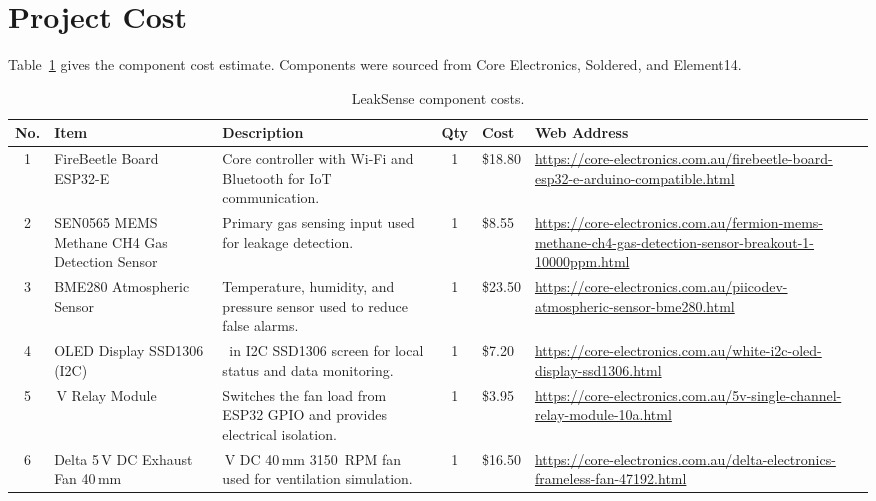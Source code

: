 \documentclass[a4paper,10pt,conference,onecolumn]{IEEEtran}
\begin{document}
\section{Project Cost}

Table~\ref{tab:cost} gives the component cost estimate. Components were sourced
from Core Electronics, Soldered, and Element14.

\begin{table}[H]
\centering
\caption{LeakSense component costs.}
\label{tab:cost}
\renewcommand{\arraystretch}{1.2}
\setlength{\tabcolsep}{2.5pt}
\scriptsize
\begin{tabularx}{\linewidth}{c
  >{\raggedright\arraybackslash}p{1.8cm}
  >{\raggedright\arraybackslash}X
  c
  >{\raggedleft\arraybackslash}p{0.8cm}
  >{\raggedright\arraybackslash}p{6.2cm}}
\toprule
\textbf{No.} & \textbf{Item} & \textbf{Description} & \textbf{Qty} &
\textbf{Cost} & \textbf{Web Address} \\
\midrule
1 & FireBeetle Board ESP32-E & Core controller with Wi-Fi and Bluetooth for
IoT communication. & 1 & \$18.80 &
\url{https://core-electronics.com.au/firebeetle-board-esp32-e-arduino-compatible.html} \\
2 & SEN0565 MEMS Methane CH4 Gas Detection Sensor & Primary gas sensing input
used for leakage detection. & 1 & \$8.55 &
\url{https://core-electronics.com.au/fermion-mems-methane-ch4-gas-detection-sensor-breakout-1-10000ppm.html} \\
3 & BME280 Atmospheric Sensor & Temperature, humidity, and pressure sensor used
to reduce false alarms. & 1 & \$23.50 &
\url{https://core-electronics.com.au/piicodev-atmospheric-sensor-bme280.html} \\
4 & OLED Display SSD1306 (I2C) & 0.96~in I2C SSD1306 screen for local status
and data monitoring. & 1 & \$7.20 &
\url{https://core-electronics.com.au/white-i2c-oled-display-ssd1306.html} \\
5 & 5\,V Relay Module & Switches the fan load from ESP32 GPIO and provides
electrical isolation. & 1 & \$3.95 &
\url{https://core-electronics.com.au/5v-single-channel-relay-module-10a.html} \\
6 & Delta 5\,V DC Exhaust Fan 40\,mm & 5\,V DC 40\,mm 3150~RPM fan used for
ventilation simulation. & 1 & \$16.50 &
\url{https://core-electronics.com.au/delta-electronics-frameless-fan-47192.html} \\

\end{tabularx}
\end{table}
\end{document}
